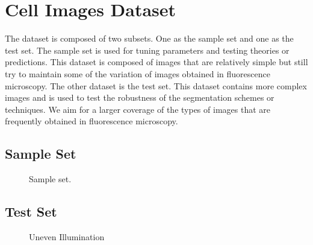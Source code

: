 
\chapter{Cell Images Dataset} %

\label{AppendixA} %

The dataset is composed of two subsets. One as the sample set and one as the test set. The sample set is used for tuning parameters and testing theories or predictions. This dataset is composed of images that are relatively simple but still try to maintain some of the variation of images obtained in fluorescence microscopy. The other dataset is the test set. This dataset contains more complex images and is used to test the robustness of the segmentation schemes or techniques. We aim for a larger coverage of the types of images that are frequently obtained in fluorescence microscopy.

\section{Sample Set}
\begin{figure}[!h]
	\centering
	\caption{Sample set.}
	\label{fig:sampleset}
\end{figure}

\section{Test Set}

\begin{figure}[!h]
	\centering
	\caption{Uneven Illumination}
	\label{fig:unevenillumination}
\end{figure}

